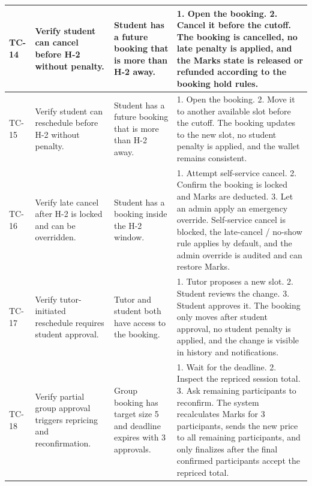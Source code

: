 \documentclass[11pt,a4paper]{article}
\begin{document}
\begin{longtable}{|L{1.2cm}|L{3.3cm}|L{3.9cm}|L{6.0cm}|}
	\hline
	TC-14          & Verify student can cancel before H-2 without penalty.                & Student has a future booking that is more than H-2 away.               & 1. Open the booking. 2. Cancel it before the cutoff. \newline The booking is cancelled, no late penalty is applied, and the Marks state is released or refunded according to the booking hold rules.                                                                                                            \\
	\hline
	TC-15          & Verify student can reschedule before H-2 without penalty.            & Student has a future booking that is more than H-2 away.               & 1. Open the booking. 2. Move it to another available slot before the cutoff. \newline The booking updates to the new slot, no student penalty is applied, and the wallet remains consistent.                                                                                                                    \\
	\hline
	TC-16          & Verify late cancel after H-2 is locked and can be overridden.        & Student has a booking inside the H-2 window.                           & 1. Attempt self-service cancel. 2. Confirm the booking is locked and Marks are deducted. 3. Let an admin apply an emergency override. \newline Self-service cancel is blocked, the late-cancel / no-show rule applies by default, and the admin override is audited and can restore Marks.                      \\
	\hline
	TC-17          & Verify tutor-initiated reschedule requires student approval.         & Tutor and student both have access to the booking.                     & 1. Tutor proposes a new slot. 2. Student reviews the change. 3. Student approves it. \newline The booking only moves after student approval, no student penalty is applied, and the change is visible in history and notifications.                                                                             \\
	\hline
	TC-18          & Verify partial group approval triggers repricing and reconfirmation. & Group booking has target size 5 and deadline expires with 3 approvals. & 1. Wait for the deadline. 2. Inspect the repriced session total. 3. Ask remaining participants to reconfirm. \newline The system recalculates Marks for 3 participants, sends the new price to all remaining participants, and only finalizes after the final confirmed participants accept the repriced total. \\

\end{longtable}
\end{document}
